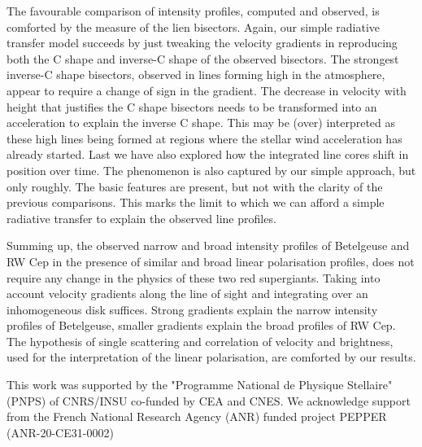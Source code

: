 \documentclass{/Users/art2/TeX/aanda/aa}
\begin{document}
The favourable comparison of intensity profiles, computed and observed, is comforted by the measure of the lien bisectors. Again, our simple radiative 
transfer model succeeds by just tweaking the velocity gradients in reproducing both the C shape and inverse-C shape of the observed bisectors. The 
strongest inverse-C shape bisectors, observed in lines forming high in the atmosphere, appear to require a change of sign in the gradient. The decrease 
in velocity with height that justifies the C shape bisectors needs to be transformed into an acceleration to explain the inverse C shape. This may 
be (over) interpreted as these high lines being formed at regions where the stellar wind acceleration has already started.  Last we have also 
explored how the integrated line cores shift in position over time. The phenomenon is also captured by our simple approach, but only roughly. The basic 
features are present, but not with the clarity of the previous comparisons. This marks the limit to which we can afford a simple radiative transfer 
to explain the observed line profiles.

Summing up, the observed  narrow and broad intensity profiles of Betelgeuse and RW Cep in the presence of similar and broad linear polarisation 
profiles, does not require any change in the physics of these two red supergiants. Taking into account velocity gradients along the line of sight 
and integrating over an inhomogeneous disk suffices. Strong gradients explain the narrow intensity profiles of Betelgeuse, smaller gradients explain 
the broad profiles of RW Cep. The hypothesis of single scattering and correlation of velocity and brightness, used for the interpretation of the 
linear polarisation, are comforted by our results.




\begin{acknowledgements}
This work was supported by the "Programme National de Physique Stellaire" (PNPS) of CNRS/INSU co-funded by CEA and CNES.
We acknowledge support from the French National Research Agency (ANR)
funded project PEPPER (ANR-20-CE31-0002)
\end{acknowledgements}


%



 
\end{document}

